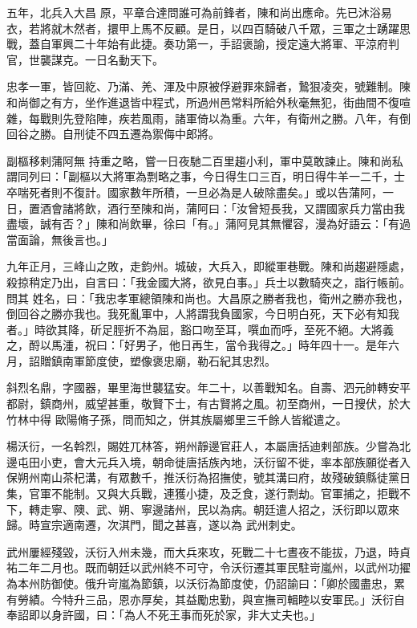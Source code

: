 \begin{pinyinscope}
 五年，北兵入大昌
 原，平章合達問誰可為前鋒者，陳和尚出應命。先已沐浴易衣，若將就木然者，擐甲上馬不反顧。是日，以四百騎破八千眾，三軍之士踴躍思戰，蓋自軍興二十年始有此捷。奏功第一，手詔褒諭，授定遠大將軍、平涼府判官，世襲謀克。一日名動天下。



 忠孝一軍，皆回紇、乃滿、羌、渾及中原被俘避罪來歸者，鷙狠凌突，號難制。陳和尚御之有方，坐作進退皆中程式，所過州邑常料所給外秋毫無犯，街曲間不復喧雜，每戰則先登陷陣，疾若風雨，諸軍倚以為重。六年，有衛州之勝。八年，有倒回谷之勝。自刑徒不四五遷為禦侮中郎將。



 副樞移剌蒲阿無
 持重之略，嘗一日夜馳二百里趨小利，軍中莫敢諫止。陳和尚私謂同列曰：「副樞以大將軍為剽略之事，今日得生口三百，明日得牛羊一二千，士卒喘死者則不復計。國家數年所積，一旦必為是人破除盡矣。」或以告蒲阿，一日，置酒會諸將飲，酒行至陳和尚，蒲阿曰：「汝曾短長我，又謂國家兵力當由我盡壞，誠有否？」陳和尚飲畢，徐曰「有。」蒲阿見其無懼容，漫為好語云：「有過當面論，無後言也。」



 九年正月，三峰山之敗，走鈞州。城破，大兵入，即縱軍巷戰。陳和尚趨避隱處，殺掠稍定乃出，自言曰：「我金國大將，欲見白事。」兵士以數騎夾之，詣行帳前。問其
 姓名，曰：「我忠孝軍總領陳和尚也。大昌原之勝者我也，衛州之勝亦我也，倒回谷之勝亦我也。我死亂軍中，人將謂我負國家，今日明白死，天下必有知我者。」時欲其降，斫足脛折不為屈，豁口吻至耳，噀血而呼，至死不絕。大將義之，酹以馬湩，祝曰：「好男子，他日再生，當令我得之。」時年四十一。是年六月，詔贈鎮南軍節度使，塑像褒忠廟，勒石紀其忠烈。



 斜烈名鼎，字國器，畢里海世襲猛安。年二十，以善戰知名。自壽、泗元帥轉安平都尉，鎮商州，威望甚重，敬賢下士，有古賢將之風。初至商州，一日搜伏，於大竹林中得
 歐陽脩子孫，問而知之，併其族屬鄉里三千餘人皆縱遣之。



 楊沃衍，一名斡烈，賜姓兀林答，朔州靜邊官莊人，本屬唐括迪剌部族。少嘗為北邊屯田小吏，會大元兵入境，朝命徙唐括族內地，沃衍留不徙，率本部族願從者入保朔州南山茶杞溝，有眾數千，推沃衍為招撫使，號其溝曰府，故殘破鎮縣徒黨日集，官軍不能制。又與大兵戰，連獲小捷，及乏食，遂行剽劫。官軍捕之，拒戰不下，轉走寧、隩、武、朔、寧邊諸州，民以為病。朝廷遣人招之，沃衍即以眾來歸。時宣宗適南遷，次淇門，聞之甚喜，遂以為
 武州刺史。



 武州屢經殘毀，沃衍入州未幾，而大兵來攻，死戰二十七晝夜不能拔，乃退，時貞祐二年二月也。既而朝廷以武州終不可守，令沃衍遷其軍民駐岢嵐州，以武州功擢為本州防御使。俄升岢嵐為節鎮，以沃衍為節度使，仍詔諭曰：「卿於國盡忠，累有勞績。今特升三品，恩亦厚矣，其益勵忠勤，與宣撫司輯睦以安軍民。」沃衍自奉詔即以身許國，曰：「為人不死王事而死於家，非大丈夫也。」




\end{pinyinscope}
